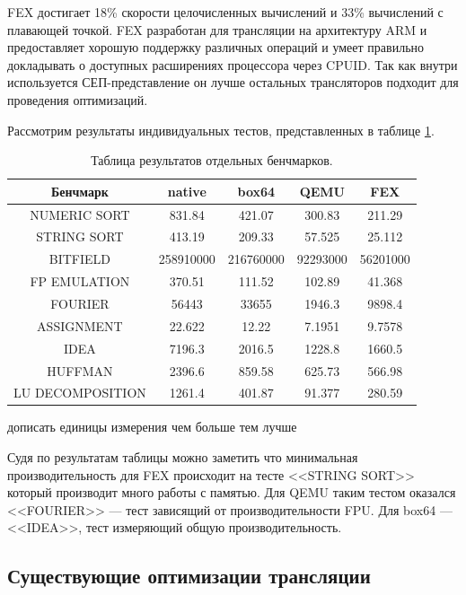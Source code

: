 FEX достигает 18\% скорости целочисленных вычислений и 33\% вычислений с плавающей точкой. FEX разработан для трансляции на архитектуру ARM и предоставляет хорошую поддержку различных операций и умеет правильно докладывать о доступных расширениях процессора через CPUID. Так как внутри используется СЕП-представление он лучше остальных трансляторов подходит для проведения оптимизаций. 

Рассмотрим результаты индивидуальных тестов, представленных в таблице \ref{table:benches}.

\begin{table}[!htb]
	\label{table:benches}
	\begin{center}
		\caption{Таблица результатов отдельных бенчмарков.}
		\begin{tabular}{|c|c|c|c|c|}
			\hline
			\bfseries Бенчмарк & \bfseries native & \bfseries box64 & \bfseries QEMU & \bfseries FEX  \\
			\hline
			NUMERIC SORT & 831.84 & 421.07 & 300.83 & 211.29 \\ \hline
			STRING SORT & 413.19 & 209.33 & 57.525 & 25.112 \\ \hline
			BITFIELD & 258910000 & 216760000 & 92293000 & 56201000 \\ \hline
			FP EMULATION & 370.51 & 111.52 & 102.89 & 41.368 \\ \hline
			FOURIER & 56443 & 33655 & 1946.3 & 9898.4 \\ \hline
			ASSIGNMENT & 22.622 & 12.22 & 7.1951 & 9.7578 \\ \hline
			IDEA & 7196.3 & 2016.5 & 1228.8 & 1660.5 \\ \hline
			HUFFMAN & 2396.6 & 859.58 & 625.73 & 566.98 \\ \hline
			LU DECOMPOSITION & 1261.4 & 401.87 & 91.377 & 280.59 \\ \hline
		\end{tabular}
	\end{center}
\end{table}

дописать единицы измерения чем больше тем лучше

\newpage

Судя по результатам таблицы можно заметить что минимальная производительность для FEX происходит на тесте <<STRING SORT>> который производит много работы с памятью. Для QEMU таким тестом оказался <<FOURIER>> --- тест зависящий от производительности FPU. Для box64 --- <<IDEA>>, тест измеряющий общую производительность.

\subsection{Существующие оптимизации трансляции}

